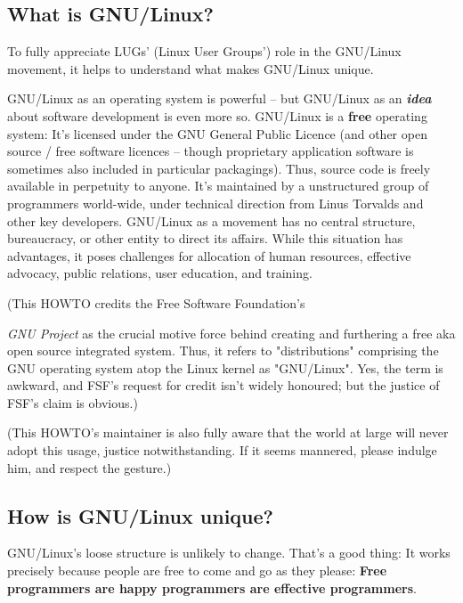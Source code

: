 \documentclass{HOWTO}
\begin{document}
\subsection{What is GNU/Linux?}

To fully appreciate LUGs' (Linux User Groups') role in the GNU/Linux 
movement, it helps to understand what makes GNU/Linux unique.

GNU/Linux as an operating system is powerful -- but GNU/Linux as an
{\itshape {\bfseries idea}\/} about software development is even more so. GNU/Linux
is a {\bfseries free} operating system: It's licensed under the GNU General
Public Licence (and other open source / free software licences -- though 
proprietary application software is sometimes also included in
particular packagings). Thus, source code is freely available in
perpetuity to anyone. It's maintained by a unstructured group of
programmers world-wide, under technical direction from Linus Torvalds
and other key developers. GNU/Linux as a movement has no central
structure, bureaucracy, or other entity to direct its affairs. While
this situation has advantages, it poses challenges for allocation of
human resources, effective advocacy, public relations, user education,
and training.



(This HOWTO credits the Free Software Foundation's 

\emph{GNU Project} \texttt{\abrurl}
 as the crucial motive force behind creating and furthering a free 
aka open source integrated system.  Thus, it refers to "distributions" 
comprising the GNU operating system atop the Linux kernel as "GNU/Linux".
Yes, the term is awkward, and FSF's request for credit isn't widely 
honoured; but the justice of FSF's claim is obvious.)

(This HOWTO's maintainer is also fully aware that the world at large
will never adopt this usage, justice notwithstanding.  If it seems 
mannered, please indulge him, and respect the gesture.)






\subsection{How is GNU/Linux unique?}

GNU/Linux's loose structure is unlikely to change.  That's a good thing:
It works precisely because people are free to come and go as they
please: {\bfseries Free programmers are happy programmers are effective
programmers}.
\end{document}
